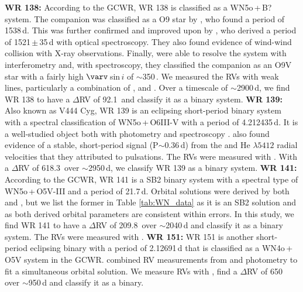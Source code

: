 \textbf{WR 138:} According to the GCWR, WR 138 is classified as a WN5o\,+\,B? system. The companion was classified as a O9 star by \citet{1990Annuk}, who found a period of 1538\,d. This was further confirmed and improved upon by \citet{2013Palate}, who derived a period of 1521\,$\pm$\,35\,d with optical spectroscopy. They also found evidence of wind-wind collision with X-ray observations. Finally, \citet{2016Richardson} were able to resolve the system with interferometry and, with spectroscopy, they classified the companion as an O9V star with a fairly high $\varv\,$sin\,$i$ of ${\sim}$350\,\kms{}. We measured the RVs with weak \nv{} lines, particularly a combination of \NVblue,{} and \NVred{}. Over a timescale of ${\sim}$2900\,d, we find WR 138 to have a $\Delta$RV of 92.1\,\kms{} and classify it as a binary system. 
\newline
\newline
\textbf{WR 139:} Also known as V444 Cyg, WR 139 is an eclipsing short-period binary system with a spectral classification of WN5o\,+\,O6III-V with a period of 4.212435\,d. It is a well-studied object both with photometry \citep[and references within]{1986MoffatShara,1998MarchenkoMoffatPhotometry} and spectroscopy \citep{1994Marchenko}. \citet{1994Marchenko} also found evidence of a stable, short-period signal (P${\sim}$0.36\,d) from the \HeII{} and He\,{}\,$\lambda 5412$ radial velocities that they attributed to pulsations. The RVs were measured with \NVred. With a $\Delta$RV of 618.3\,\kms{} over ${\sim}$2950\,d, we classify WR 139 as a binary system. 
\newline
\newline
\textbf{WR 141:} According to the GCWR, WR 141 is a SB2 binary system with a spectral type of WN5o\,+\,O5V-III and a period of 21.7\,d. Orbital solutions were derived by both \citet{1998Marchenko1998WR141} and \citet{1999Ivanov}, but we list the former in Table \ref{tab:WN_data} as it is an SB2 solution and as both derived orbital parameters are consistent within errors. In this study, we find WR 141 to have a $
\Delta$RV of 209.8\,\kms{} over ${\sim}$2040\,d  and classify it as a binary system. The RVs were measured with \NVred.
\newline
\newline
\textbf{WR 151:} WR 151 is another short-period eclipsing binary with a period of 2.12691\,d that is classified as a WN4o\,+\,O5V system in the GCWR. \citet{2009HuttonWR151} combined RV measurements from \citet{1993LewisWR151} and photometry to fit a simultaneous orbital solution. We measure RVs with \NVred, find a $\Delta$RV of 650\,\kms{} over ${\sim}$950\,d and classify it as a binary.

